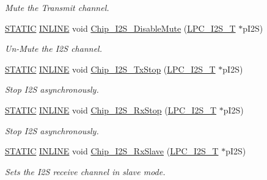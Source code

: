 \begin{DoxyCompactItemize}
\begin{DoxyCompactList}\small\item\em Mute the Transmit channel. \end{DoxyCompactList}\item 
\hyperlink{group___l_p_c___types___public___macros_ga10b2d890d871e1489bb02b7e70d9bdfb}{S\+T\+A\+T\+IC} \hyperlink{spifi__18xx__43xx_8h_a2eb6f9e0395b47b8d5e3eeae4fe0c116}{I\+N\+L\+I\+NE} void \hyperlink{group___i2_s__18_x_x__43_x_x_ga0c6731695f685fa21678ea3635b458f3}{Chip\+\_\+\+I2\+S\+\_\+\+Disable\+Mute} (\hyperlink{struct_l_p_c___i2_s___t}{L\+P\+C\+\_\+\+I2\+S\+\_\+T} $\ast$p\+I2S)
\begin{DoxyCompactList}\small\item\em Un-\/\+Mute the I2S channel. \end{DoxyCompactList}\item 
\hyperlink{group___l_p_c___types___public___macros_ga10b2d890d871e1489bb02b7e70d9bdfb}{S\+T\+A\+T\+IC} \hyperlink{spifi__18xx__43xx_8h_a2eb6f9e0395b47b8d5e3eeae4fe0c116}{I\+N\+L\+I\+NE} void \hyperlink{group___i2_s__18_x_x__43_x_x_gac7d296f84ba3283e63861515d134edfe}{Chip\+\_\+\+I2\+S\+\_\+\+Tx\+Stop} (\hyperlink{struct_l_p_c___i2_s___t}{L\+P\+C\+\_\+\+I2\+S\+\_\+T} $\ast$p\+I2S)
\begin{DoxyCompactList}\small\item\em Stop I2S asynchronously. \end{DoxyCompactList}\item 
\hyperlink{group___l_p_c___types___public___macros_ga10b2d890d871e1489bb02b7e70d9bdfb}{S\+T\+A\+T\+IC} \hyperlink{spifi__18xx__43xx_8h_a2eb6f9e0395b47b8d5e3eeae4fe0c116}{I\+N\+L\+I\+NE} void \hyperlink{group___i2_s__18_x_x__43_x_x_gaa78f387af78de456819cec21bbf21ada}{Chip\+\_\+\+I2\+S\+\_\+\+Rx\+Stop} (\hyperlink{struct_l_p_c___i2_s___t}{L\+P\+C\+\_\+\+I2\+S\+\_\+T} $\ast$p\+I2S)
\begin{DoxyCompactList}\small\item\em Stop I2S asynchronously. \end{DoxyCompactList}\item 
\hyperlink{group___l_p_c___types___public___macros_ga10b2d890d871e1489bb02b7e70d9bdfb}{S\+T\+A\+T\+IC} \hyperlink{spifi__18xx__43xx_8h_a2eb6f9e0395b47b8d5e3eeae4fe0c116}{I\+N\+L\+I\+NE} void \hyperlink{group___i2_s__18_x_x__43_x_x_ga87e2e425a4869e30c6b2561914cc6e46}{Chip\+\_\+\+I2\+S\+\_\+\+Rx\+Slave} (\hyperlink{struct_l_p_c___i2_s___t}{L\+P\+C\+\_\+\+I2\+S\+\_\+T} $\ast$p\+I2S)
\begin{DoxyCompactList}\small\item\em Sets the I2S receive channel in slave mode. \end{DoxyCompactList}\item 

\end{DoxyCompactItemize}
